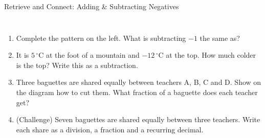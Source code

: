 \documentclass{beamer}
\newcommand{\ashow}[1]{\uncover<2->{\textcolor{red}{\small #1}}}
\newcommand{\tightlist}{%
  \setlength{\itemsep}{0pt}\setlength{\parskip}{0pt}\setlength{\topsep}{0pt}%
}
\newcommand{\dC}[1]{$#1\,^{\circ}$C}
\begin{document}
\begin{frame}[t]{Retrieve and Connect: Adding \& Subtracting Negatives}
\begin{columns}[T,onlytextwidth]
\vspace{-1.5em}
\footnotesize
\begin{enumerate}\tightlist
{\setlength{\columnsep}{14pt}%
}
  \item Complete the pattern on the left. What is subtracting $-1$ the same as?
        \ashow{Adding $1$}
  \item It is \dC{5} at the foot of a mountain and \dC{-12} at the top. How much colder
        is the top? Write this as a subtraction.
        \ashow{$5-(-12)=17$ degrees}
  \item Three baguettes are shared equally between teachers A, B, C and D. Show on
        the diagram how to cut them. What fraction of a baguette does each teacher get?
        \ashow{Three quarters of a baguette}
  \item (Challenge) Seven baguettes are shared equally between three teachers. Write
        each share as a division, a fraction and a recurring decimal.
        \ashow{$7\div3=\dfrac73=2.\dot{3}$}
\end{enumerate}
\end{columns}
\end{frame}
\end{document}
